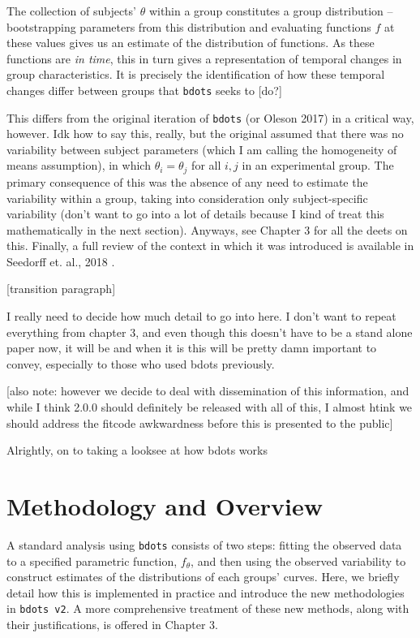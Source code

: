 \documentclass{article}
\newcommand{\xt}{\texttt}%
\begin{document}
The collection of subjects' $\theta$  within a group constitutes a group distribution -- bootstrapping parameters from this distribution and evaluating functions $f$ at these values gives us an estimate of the distribution of functions. As these functions are \textit{in time}, this in turn gives a representation of temporal changes in group characteristics. It is precisely the identification of how these temporal changes differ between groups that \xt{bdots} seeks to [do?]

This differs from the original iteration of \xt{bdots} (or Oleson 2017) in a critical way, however. Idk how to say this, really, but the original assumed that there was no variability between subject parameters (which I am calling the homogeneity of means assumption), in which $\theta_i = \theta_j$ for all $i,j$ in an experimental group. The primary consequence of this was the absence of any need to estimate the variability within a group, taking into consideration only subject-specific variability (don't want to go into a lot of details because I kind of treat this mathematically in the next section). Anyways, see Chapter 3 for all the deets on this. Finally, a full review of the context in which it was introduced is available in Seedorff et. al., 2018 \cite{seedorff2018bdots}.

[transition paragraph]

I really need to decide how much detail to go into here. I don't want to repeat everything from chapter 3, and even though this doesn't have to be a stand alone paper now, it will be and when it is this will be pretty damn important to convey, especially to those who used bdots previously.

[also note: however we decide to deal with dissemination of this information, and while I think 2.0.0 should definitely be released with all of this, I almost htink we should address the fitcode awkwardness before this is presented to the public]

Alrightly, on to taking a looksee at how bdots works


\section{Methodology and Overview} 

A standard analysis using \xt{bdots} consists of two steps: fitting the observed data to a specified parametric function, $f_\theta$, and then using the observed variability to construct estimates of the distributions of each groups' curves.  Here, we briefly detail how this is implemented in practice and introduce the new methodologies in \xt{bdots v2}. A more comprehensive treatment of these new methods, along with their justifications, is offered in Chapter 3. 
\end{document}
